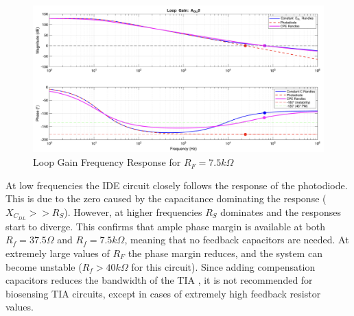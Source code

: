 \begin{figure}[H]
    \centering
        \centering
        \includegraphics[width=\textwidth]{MatLabLG_7500.png}
    \caption{Loop Gain Frequency Response for $R_F=7.5k\Omega$}
    \label{fig:matlab_lg}
\end{figure}
At low frequencies the IDE circuit closely follows the response of the photodiode. This is due to the zero caused by the capacitance dominating the response ($X_{C_{DL}}>>R_S$). However, at higher frequencies $R_S$ dominates and the responses start to diverge. This confirms that ample phase margin is available at both $R_f=37.5\Omega$ and $R_f=7.5k\Omega$, meaning that no feedback capacitors are needed. At extremely large values of $R_F$ the phase margin reduces, and the system can become unstable ($R_f>40k\Omega$ for this circuit). Since adding compensation capacitors reduces the bandwidth of the TIA \cite{StabilizeYourTransimpedance}, it is not recommended for biosensing TIA circuits, except in cases of extremely high feedback resistor values.
